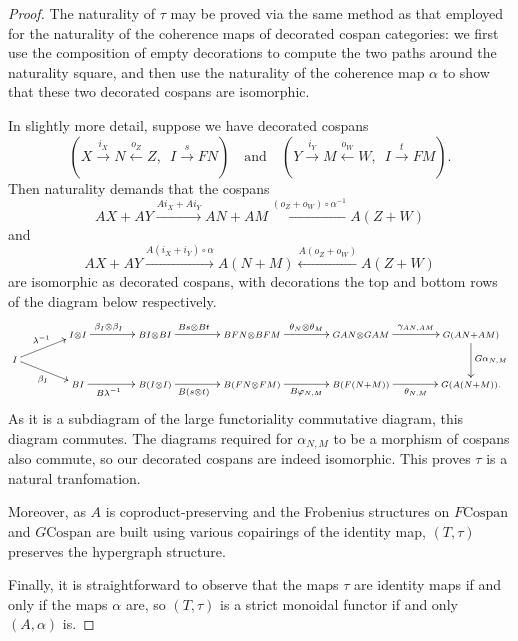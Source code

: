 \begin{proof}
The naturality of $\tau$ may be proved via the same method as that employed for
the naturality of the coherence maps of decorated cospan categories: we first
use the composition of empty decorations to compute the two paths around the
naturality square, and then use the naturality of the coherence map $\alpha$ to
show that these two decorated cospans are isomorphic.

In slightly more detail, suppose we have decorated cospans
\[
  (X \stackrel{i_X}\longrightarrow N
  \stackrel{o_Z}\longleftarrow Z,\enspace I \stackrel{s}\longrightarrow FN) \quad
  \textrm{and} \quad (Y \stackrel{i_Y}\longrightarrow M
  \stackrel{o_W}\longleftarrow W,\enspace I \stackrel{t}\longrightarrow FM).
\]
Then naturality demands that the cospans
\[
  AX+AY \xrightarrow{Ai_X+Ai_Y} AN+AM \xleftarrow{(o_Z+o_W)\circ\alpha^{-1}}
  A(Z+W)
\]
and
\[
  AX+AY \xrightarrow{A(i_X+i_Y)\circ\alpha} A(N+M) \xleftarrow{A(o_Z+o_W)}
  A(Z+W)
\]
are isomorphic as decorated cospans, with decorations the top and bottom rows of
the diagram below respectively.
\[
  \xymatrixcolsep{3pc}
  \xymatrixrowsep{.7pc}
  \xymatrix{
    & \scriptstyle  \scriptstyle I \otimes I \ar[r]^(.4){\beta_I \otimes \beta_I} & \scriptstyle  BI \otimes BI \ar[r]^(.4){Bs
    \otimes Bt} & \scriptstyle  BFN \otimes BFM \ar[r]^{\theta_N \otimes \theta_M} & \scriptstyle  GAN \otimes
    GAM \ar[r]^{\gamma_{AN,AM}} & \scriptstyle  G(AN+AM) \ar[dd]^{G\alpha_{N,M}} \\
    \scriptstyle I \ar[ur]^{\lambda^{-1}} \ar[dr]_{\beta_I} \\
    & \scriptstyle  BI \ar[r]_(.4){B\lambda^{-1}} & \scriptstyle  B(I \otimes I) \ar[r]_(.4){B(s\otimes t)} & \scriptstyle  B(FN
    \otimes FM) \ar[r]_{B\varphi_{N,M}} & \scriptstyle  B(F(N+M))
    \ar[r]_{\theta_{N,M}} & \scriptstyle  G(A(N+M)).
  }
\]
As it is a subdiagram of the large functoriality commutative diagram, this
diagram commutes. The diagrams required for $\alpha_{N,M}$ to be a morphism of
cospans also commute, so our decorated cospans are indeed isomorphic. This
proves $\tau$ is a natural tranfomation.  

Moreover, as $A$ is coproduct-preserving and the Frobenius structures on
$F\mathrm{Cospan}$ and $G\mathrm{Cospan}$ are built using various copairings
of the identity map, $(T,\tau)$ preserves the hypergraph structure.

Finally, it is straightforward to observe that the maps $\tau$ are identity
maps if and only if the maps $\alpha$ are, so $(T,\tau)$ is a strict monoidal
functor if and only $(A,\alpha)$ is.
\end{proof}

